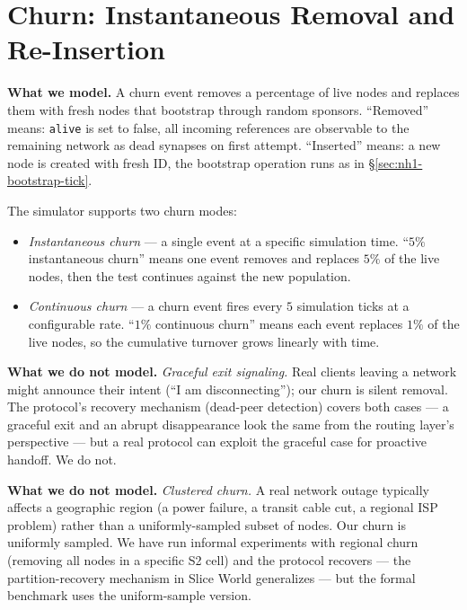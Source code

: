 \documentclass[twoside,nobib]{tufte-book}
\begin{document}
\section{Churn: Instantaneous Removal and Re-Insertion}

\textbf{What we model.} A churn event removes a percentage of
live nodes and replaces them with fresh nodes that bootstrap
through random sponsors. ``Removed'' means: \texttt{alive} is
set to false, all incoming references are observable to the
remaining network as dead synapses on first attempt. ``Inserted''
means: a new node is created with fresh ID, the bootstrap
operation runs as in \S\ref{sec:nh1-bootstrap-tick}.

The simulator supports two churn modes:

\begin{itemize}\setlength\itemsep{0.15em}
  \item \emph{Instantaneous churn} --- a single event at a
    specific simulation time. ``$5\%$ instantaneous churn'' means
    one event removes and replaces $5\%$ of the live nodes, then
    the test continues against the new population.
  \item \emph{Continuous churn} --- a churn event fires every $5$
    simulation ticks at a configurable rate. ``$1\%$ continuous
    churn'' means each event replaces $1\%$ of the live nodes,
    so the cumulative turnover grows linearly with time.
\end{itemize}

\textbf{What we do not model.} \emph{Graceful exit signaling.} Real
clients leaving a network might announce their intent (``I am
disconnecting''); our churn is silent removal. The protocol's
recovery mechanism (dead-peer detection) covers both cases ---
a graceful exit and an abrupt disappearance look the same from
the routing layer's perspective --- but a real protocol can
exploit the graceful case for proactive handoff. We do not.

\textbf{What we do not model.} \emph{Clustered churn.} A real
network outage typically affects a geographic region (a power
failure, a transit cable cut, a regional ISP problem) rather
than a uniformly-sampled subset of nodes. Our churn is uniformly
sampled. We have run informal experiments with regional churn
(removing all nodes in a specific S2 cell) and the protocol
recovers --- the partition-recovery mechanism in Slice World
generalizes --- but the formal benchmark uses the uniform-sample
version.
\end{document}
